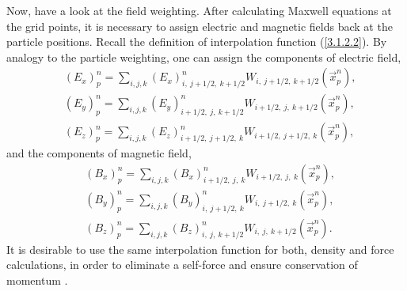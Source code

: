 Now, have a look at the field weighting. After calculating Maxwell equations at the grid points, it is necessary to assign electric and magnetic fields back at the particle positions. Recall the definition of interpolation function (\ref{3.1.2.2}). By analogy to the particle weighting, one can assign the components of electric field,
\begin{equation}
\begin{split}
& \left(E_{x}\right)_{p}^{n}  = \sum_{i, j, k} \left(E_{x}\right)^{n}_{i,\: j + 1/2,\: k + 1/2} W_{i,\: j + 1/2,\: k + 1/2} \left(\vec{x}_{p}^{n} \right), \\
& \left(E_{y}\right)_{p}^{n}  = \sum_{i, j, k} \left(E_{y}\right)^{n}_{i + 1/2,\: j,\: k + 1/2} W_{i + 1/2,\: j,\: k + 1/2} \left(\vec{x}_{p}^{n} \right), \\
& \left(E_{z}\right)_{p}^{n}  = \sum_{i, j, k} \left(E_{z}\right)^{n}_{i + 1/2,\: j + 1/2,\: k} W_{i + 1/2,\: j + 1/2,\: k} \left(\vec{x}_{p}^{n} \right),
\end{split}
\end{equation}
and the components of magnetic field,
\begin{equation}
\begin{split}
& \left(B_{x}\right)_{p}^{n}  = \sum_{i, j, k} \left(B_{x}\right)^{n}_{i + 1/2,\: j,\: k} W_{i + 1/2,\: j,\: k} \left(\vec{x}_{p}^{n} \right), \\
& \left(B_{y}\right)_{p}^{n}  = \sum_{i, j, k} \left(B_{y}\right)^{n}_{i,\: j + 1/2,\: k} W_{i,\: j + 1/2,\: k} \left(\vec{x}_{p}^{n} \right), \\
& \left(B_{z}\right)_{p}^{n}  = \sum_{i, j, k} \left(B_{z}\right)^{n}_{i,\: j,\: k + 1/2} W_{i,\: j,\: k + 1/2} \left(\vec{x}_{p}^{n} \right).
\end{split}
\end{equation} 
It is desirable to use the same interpolation function for both, density and force calculations, in order to eliminate a self-force and ensure conservation of momentum \cite{fehske}.
